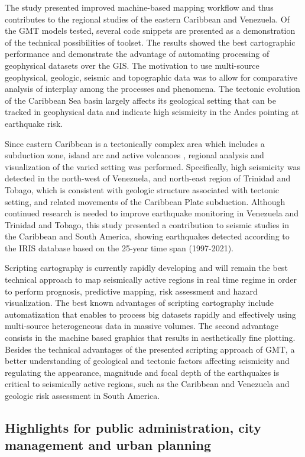 \documentclass[sustainability,article,submit,pdftex,moreauthors]{Definitions/mdpi}
\begin{document}
The study presented improved machine-based mapping workflow and thus contributes to the regional studies of the eastern Caribbean and Venezuela. Of the GMT models tested, several code snippets are presented as a demonstration of the technical possibilities of toolset. The results showed the best cartographic performance and demonstrate the advantage of automating processing of geophysical datasets over the GIS. The motivation to use multi-source geophysical, geologic, seismic and topographic data was to allow for comparative analysis of interplay among the processes and phenomena. The tectonic evolution of the Caribbean Sea basin largely affects its geological setting that can be tracked in geophysical data and indicate high seismicity in the Andes pointing at earthquake risk.

Since eastern Caribbean is a tectonically complex area which includes a subduction zone, island arc and active volcanoes \cite{Ambeh}, regional analysis and visualization of the varied setting was performed. Specifically, high seismicity was detected in the north-west of Venezuela, and north-east region of Trinidad and Tobago, which is consistent with geologic structure associated with tectonic setting, and related movements of the Caribbean Plate subduction. Although continued research is needed to improve earthquake monitoring in Venezuela and Trinidad and Tobago, this study presented a contribution to seismic studies in the Caribbean and South America, showing earthquakes detected according to the IRIS database based on the 25-year time span (1997-2021). 
	
Scripting cartography is currently rapidly developing and will remain the best technical approach to map seismically active regions in real time regime in order to perform prognosis, predictive mapping, risk assessment and hazard visualization. The best known advantages of scripting cartography include automatization that enables to process big datasets rapidly and effectively using multi-source heterogeneous data in massive volumes. The second advantage consists in the machine based graphics that results in aesthetically fine plotting. Besides the technical advantages of the presented scripting approach of GMT, a better understanding of geological and tectonic factors affecting seismicity and regulating the appearance, magnitude and focal depth of the earthquakes is critical to seismically active regions, such as the Caribbean and Venezuela and geologic risk assessment in South America.

\subsection{Highlights for public administration, city management and urban planning}
\end{document}
